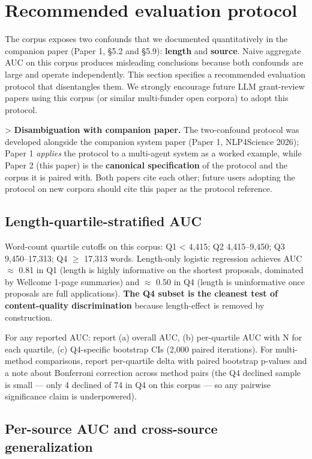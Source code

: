 \documentclass[11pt]{article}
\begin{document}
\section{Recommended evaluation protocol}

The corpus exposes two confounds that we documented quantitatively in the companion paper (Paper 1, §5.2 and §5.9): \textbf{length} and \textbf{source}. Naive aggregate AUC on this corpus produces misleading conclusions because both confounds are large and operate independently. This section specifies a recommended evaluation protocol that disentangles them. We strongly encourage future LLM grant-review papers using this corpus (or similar multi-funder open corpora) to adopt this protocol.

> \textbf{Disambiguation with companion paper.} The two-confound protocol was developed alongside the companion system paper (Paper 1, NLP4Science 2026); Paper 1 \emph{applies} the protocol to a multi-agent system as a worked example, while Paper 2 (this paper) is the \textbf{canonical specification} of the protocol and the corpus it is paired with. Both papers cite each other; future users adopting the protocol on new corpora should cite this paper as the protocol reference.

\subsection{Length-quartile-stratified AUC}

Word-count quartile cutoffs on this corpus: Q1 < 4,415; Q2 4,415--9,450; Q3 9,450--17,313; Q4 $\geq$ 17,313 words. Length-only logistic regression achieves AUC $\approx$ 0.81 in Q1 (length is highly informative on the shortest proposals, dominated by Wellcome 1-page summaries) and $\approx$ 0.50 in Q4 (length is uninformative once proposals are full applications). \textbf{The Q4 subset is the cleanest test of content-quality discrimination} because length-effect is removed by construction.

For any reported AUC: report (a) overall AUC, (b) per-quartile AUC with N for each quartile, (c) Q4-specific bootstrap CIs (2,000 paired iterations). For multi-method comparisons, report per-quartile delta with paired bootstrap p-values and a note about Bonferroni correction across method pairs (the Q4 declined sample is small --- only 4 declined of 74 in Q4 on this corpus --- so any pairwise significance claim is underpowered).

\subsection{Per-source AUC and cross-source generalization}
\end{document}
